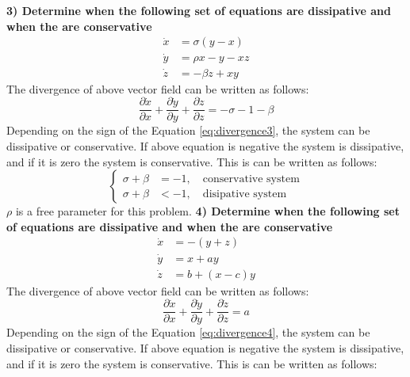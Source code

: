 \documentclass[14pt, a4paper]{extreport}
\begin{document}
\newpage
{\flushleft\large{\textbf{3) Determine when the following set of equations are dissipative and when the are conservative}}}
%
\begin{equation}
\begin{aligned}
	\dot{x} &= \sigma (y - x) \\
	\dot{y} &= \rho x - y - xz \\
	\dot{z} &= -\beta z + xy
\end{aligned}
\end{equation}
%
The divergence of above vector field can be written as follows:
%
\begin{equation}\label{eq:divergence3}
	\frac{\partial \dot{x}}{\partial x} +
	\frac{\partial \dot{y}}{\partial y} +
	\frac{\partial \dot{z}}{\partial z} = 
	-\sigma - 1 - \beta
\end{equation}
%
Depending on the sign of the Equation \eqref{eq:divergence3}, the system can be dissipative or conservative. If above equation is negative the system is dissipative, and if it is zero the system is conservative. This is can be written as follows:
%
\begin{equation}
\begin{cases}
	\sigma + \beta &= -1, \quad \text{conservative system} \\
	\sigma + \beta &< -1, \quad \text{disipative system}
\end{cases}
\end{equation}
%
$\rho$ is a free parameter for this problem.
\newpage
{\flushleft\large{\textbf{4) Determine when the following set of equations are dissipative and when the are conservative}}}
%
\begin{equation}
\begin{aligned}
	\dot{x} &= -(y + z) \\
	\dot{y} &= x + ay \\
	\dot{z} &= b + (x - c)y
\end{aligned}
\end{equation}
%
The divergence of above vector field can be written as follows:
%
\begin{equation}\label{eq:divergence4}
	\frac{\partial \dot{x}}{\partial x} +
	\frac{\partial \dot{y}}{\partial y} +
	\frac{\partial \dot{z}}{\partial z} = 
	a
\end{equation}
%
Depending on the sign of the Equation \eqref{eq:divergence4}, the system can be dissipative or conservative. If above equation is negative the system is dissipative, and if it is zero the system is conservative. This is can be written as follows:
\end{document}
